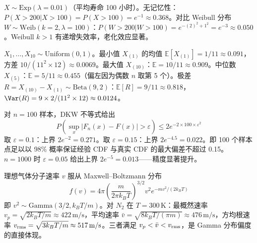 \begin{exbox}[指数分布的无记忆性验证]
$X\sim\mathrm{Exp}(\lambda=0.01)$（平均寿命 100 小时）。无记忆性：$P(X>200|X>100)=P(X>100)=e^{-1}\approx0.368$。对比 Weibull 分布 $W\sim\mathrm{Weib}(k=2,\lambda=100)$：$P(W>200|W>100)=e^{-(2)^2+1^2}=e^{-3}\approx0.050$。Weibull $k>1$ 有递增失效率，老化效应显著。
\end{exbox}
\begin{exbox}[$n=10$ 均匀分布的顺序统计量]
$X_1,\ldots,X_{10}\sim\mathrm{Uniform}(0,1)$。最小值 $X_{(1)}$ 的均值 $\mathbb E[X_{(1)}]=1/11\approx0.091$，方差 $10/(11^2\times12)\approx0.0069$。最大值 $X_{(10)}$：$\mathbb E=10/11\approx0.909$。中位数 $X_{(5)}$：$\mathbb E=5/11\approx0.455$（偏左因为偶数 $n$ 取第 5 个）。极差 $R=X_{(10)}-X_{(1)}\sim\mathrm{Beta}(9,2)$：$\mathbb E[R]=9/11\approx0.818$，$\Var(R)=9\times2/(11^2\times12)\approx0.0124$。
\end{exbox}
\begin{exbox}
对 $n=100$ 样本，DKW 不等式给出
\[
P\!\left(\sup_x|F_n(x)-F(x)|>\varepsilon\right)\le2e^{-2\times100\times\varepsilon^2}
\]
取 $\varepsilon=0.1$：上界 $2e^{-2}=0.271$。取 $\varepsilon=0.15$：上界 $2e^{-4.5}=0.022$。即 100 个样本点足以以 98\% 概率保证经验 CDF 与真实 CDF 的最大偏差不超过 0.15。$n=1000$ 时 $\varepsilon=0.05$ 给出上界 $2e^{-5}=0.013$——精度显著提升。
\end{exbox}
\begin{exbox}
理想气体分子速率 $v$ 服从 Maxwell--Boltzmann 分布
\[
f(v)=4\pi\left(\frac{m}{2\pi k_BT}\right)^{3/2}v^2 e^{-mv^2/(2k_BT)}
\]
即 $v^2\sim\mathrm{Gamma}(3/2,k_BT/m)$。对 $N_2$ 在 $T=300\,\mathrm{K}$：最概然速率 $v_p=\sqrt{2k_BT/m}\approx422\,\mathrm{m/s}$，平均速率 $\bar v=\sqrt{8k_BT/(\pi m)}\approx476\,\mathrm{m/s}$，方均根速率 $v_{\rm rms}=\sqrt{3k_BT/m}\approx517\,\mathrm{m/s}$。三者满足 $v_p<\bar v<v_{\rm rms}$，是 Gamma 分布偏度的直接体现。
\end{exbox}




